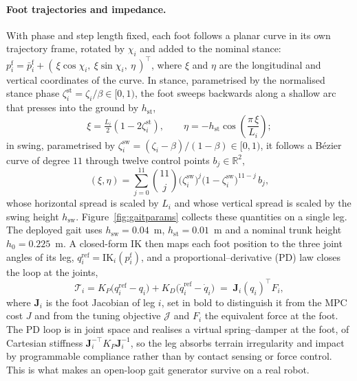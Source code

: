 \documentclass[11pt,a4paper]{article}
\newcommand{\R}{\mathbb{R}}
\newcommand{\pf}{p^{\mathrm{f}}}
\begin{document}
\paragraph{Foot trajectories and impedance.} With phase and step length fixed, each foot follows a planar
curve in its own trajectory frame, rotated by $\chi_i$ and added to the nominal stance:
$\pf_i=\bar\pf_i+(\,\xi\cos\chi_i,\ \xi\sin\chi_i,\ \eta\,)^{\!\top}$, where $\xi$ and $\eta$ are the
longitudinal and vertical coordinates of the curve. In stance, parametrised by the normalised stance phase
$\zeta_i^{\mathrm{st}}=\zeta_i/\beta\in[0,1)$, the foot sweeps backwards along a shallow arc that presses into
the ground by $h_{\mathrm{st}}$,
\begin{equation}
  \xi=\tfrac{L_i}{2}\left(1-2\zeta_i^{\mathrm{st}}\right),\qquad
  \eta=-h_{\mathrm{st}}\cos\!\left(\frac{\pi\,\xi}{L_i}\right);
  \label{eq:stance}
\end{equation}
in swing, parametrised by $\zeta_i^{\mathrm{sw}}=(\zeta_i-\beta)/(1-\beta)\in[0,1)$, it follows a Bézier curve
of degree $11$ through twelve control points $b_j\in\R^2$,
\begin{equation}
  (\xi,\eta)=\sum_{j=0}^{11}\binom{11}{j}
             \big(\zeta_i^{\mathrm{sw}}\big)^{j}\big(1-\zeta_i^{\mathrm{sw}}\big)^{11-j}\,b_j ,
  \label{eq:swing}
\end{equation}
whose horizontal spread is scaled by $L_i$ and whose vertical spread is scaled by the swing height
$h_{\mathrm{sw}}$. Figure~\ref{fig:gaitparams} collects these quantities on a single leg. The deployed gait uses $h_{\mathrm{sw}}=0.04$~m, $h_{\mathrm{st}}=0.01$~m and a nominal
trunk height $h_0=0.225$~m. A closed-form IK then maps each foot position to the three joint angles of its
leg, $q_i^{\mathrm{ref}}=\mathrm{IK}_i(\pf_i)$, and a proportional--derivative (PD) law closes the loop at the
joints,
\begin{equation}
  \mathcal{T}_i = K_P\big(q_i^{\mathrm{ref}}-q_i\big)+K_D\big(\dot q_i^{\mathrm{ref}}-\dot q_i\big)
  \;=\;\bm{J}_i(q_i)^{\!\top}F_i ,
  \label{eq:impedance}
\end{equation}
where $\bm{J}_i$ is the foot Jacobian of leg $i$, set in bold to distinguish it from the MPC cost $J$ and
from the tuning objective $\mathcal{J}$ and $F_i$ the equivalent force at the
foot. The PD loop is in joint space and
realises a virtual spring--damper at the foot, of Cartesian stiffness
$\bm{J}_i^{-\top}K_P\bm{J}_i^{-1}$, so the leg absorbs terrain irregularity and impact by
programmable compliance rather than by contact sensing or force control. This is what makes an open-loop gait
generator survive on a real robot.
\end{document}
